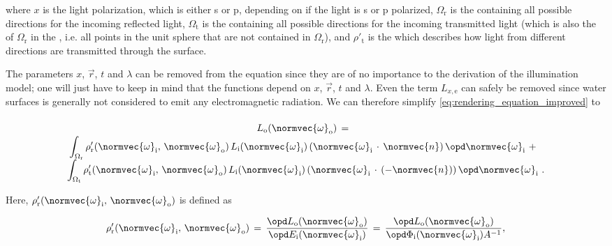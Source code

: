 {where $x$ is the light polarization, which is either s or p, depending on if the light is s or p polarized, $\Omega_{\text{r}}$ is the  containing all possible directions for the incoming reflected light, $\Omega_{\text{t}}$ is the  containing all possible directions for the incoming transmitted light (which is also the  of $\Omega_{\text{r}}$ in the , i.e. all points in the unit sphere that are not contained in $\Omega_{\text{r}}$), and $\rho'_{\text{t}}$ is the \BTDF which describes how light from different directions are transmitted through the surface.

The parameters $x$, $\vec{r}$, $t$ and $\lambda$ can be removed from the equation since they are of no importance to the derivation of the illumination model; one will just have to keep in mind that the functions depend on $x$, $\vec{r}$, $t$ and $\lambda$. Even the term $L_{x, \text{e}}$ can safely be removed since water surfaces is generally not considered to emit any electromagnetic radiation. We can therefore simplify \eqref{eq:rendering_equation_improved} to

\begin{equation} \label{eq:rendering_equation_reduced}
\renewcommand*{\arraystretch}{1.5}
\begin{array}{cl}
L_{\text{o}}(\normvec{\omega}_{\text{o}}) \,= \\
\displaystyle \int_{\Omega_{\text{r}}} \rho'_{\text{r}}(\normvec{\omega}_{\text{i}},\, \normvec{\omega}_{\text{o}})\, L_{\text{i}}(\normvec{\omega}_{\text{i}})\, (\normvec{\omega}_{\text{i}}\,\cdot\,\normvec{n})\, \opd \normvec{\omega}_{\text{i}} \ + \\[1ex]
\displaystyle \int_{\Omega_{\text{t}}} \rho'_{\text{t}}(\normvec{\omega}_{\text{i}},\, \normvec{\omega}_{\text{o}})\, L_{\text{i}}(\normvec{\omega}_{\text{i}})\, (\normvec{\omega}_{\text{i}}\,\cdot\,(-\normvec{n}))\, \opd \normvec{\omega}_{\text{i}} & \!\!\!\! .
\end{array}
\end{equation}

Here, $\rho'_{\text{r}}(\normvec{\omega}_{\text{i}},\, \normvec{\omega}_{\text{o}})$ is defined as

\begin{equation} \label{eq:brdf_definition}
\rho'_{\text{r}}(\normvec{\omega}_{\text{i}},\, \normvec{\omega}_{\text{o}}) \,=\, \frac{\opd L_{\text{o}}(\normvec{\omega}_{\text{o}})}{\opd E_{\text{i}}(\normvec{\omega}_{\text{i}})} \,=\, \frac{\opd L_{\text{o}}(\normvec{\omega}_{\text{o}})}{\opd \Phi_{\text{i}}(\normvec{\omega}_{\text{i}})A^{-1}},
\end{equation}

}
